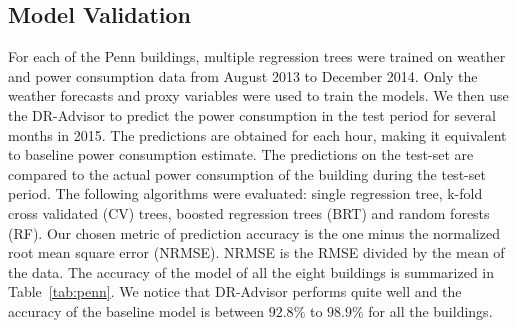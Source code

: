 \documentclass{sig-alternate-ipsn13}
\theoremstyle{definition}
\begin{document}
\subsection{Model Validation}
For each of the Penn buildings, multiple regression trees were trained on weather and power consumption data from August 2013 to  December 2014. 
Only the weather forecasts and proxy variables were used to train the models.
We then use the DR-Advisor to predict the power consumption in the test period \ie for several months in 2015. 
The predictions are obtained for each hour, making it equivalent to baseline power consumption estimate. 
The predictions on the test-set are compared to the actual power consumption of the building during the test-set period. 
The following algorithms were evaluated: single regression tree, k-fold cross validated (CV) trees, boosted regression trees (BRT) and random forests (RF).
Our chosen metric of prediction accuracy is the one minus the normalized root mean square error (NRMSE). NRMSE is the RMSE divided by the mean of the data. The accuracy of the model of all the eight buildings is summarized in Table~\ref{tab:penn}. We notice that DR-Advisor performs quite well and the accuracy of the baseline model is between $92.8\%$ to $98.9\%$ for all the buildings.
\begin{table}
\caption{Model validation with Penn data}
\vspace{3pt}
 \label{tab:penn}   
\end{table}
\end{document}
